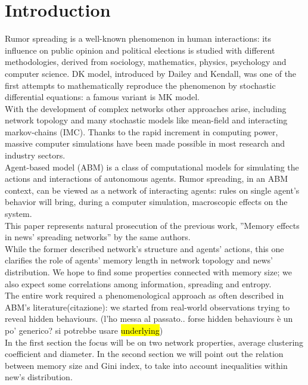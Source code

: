 \section{Introduction} \label{introduction}
Rumor spreading is a well-known phenomenon in human interactions:
its influence on public opinion\cite{publicoprumsp} and political
elections\cite{politicalrumsp} is studied with different
methodologies, derived from sociology, mathematics,
physics, psychology and computer science.
DK model,\cite{DKmodel} introduced by Dailey and Kendall, was one of
the first attempts to mathematically reproduce the phenomenon by
stochastic differential equations: a famous variant is MK
model.\cite{MKmodel}\\
With the development of complex networks other approaches arise,
including network topology and many stochastic models
like mean-field\cite{meanfield} and interacting markov-chains\cite{IMC} (IMC).
Thanks to the rapid increment in computing power,
massive computer simulations have been made possible in
most research and industry sectors.\\
Agent-based model (ABM) is a class of computational models for
simulating the actions and interactions of autonomous
agents.\cite{Agentbased}
Rumor spreading, in an ABM context, can be viewed as a network
of interacting agents: rules on single agent's behavior
will bring, during a computer simulation, macroscopic
effects on the system.\\
This paper represents natural prosecution of the previous work,
''Memory effects in news' spreading networks'' by the same
authors.\cite{ourpaper}\\
While the former described network's structure and agents' actions,
this one clarifies the role of agents' memory length in network
topology and news' distribution.
We hope to find some properties connected with memory size;
we also expect some correlations among information,
spreading and entropy.\\
The entire work required a phenomenological approach as often described in
ABM's literature(citazione): we started from real-world observations trying
to reveal hidden behaviours.
(l'ho messa al passato.. forse hidden behaviours è un po' generico?
si potrebbe usare \hl{underlying})\\
 In the first section the focus will be on two network properties, average clustering coefficient
and diameter. In the second section we will point out the relation
between memory size and Gini index, to take into account inequalities
within new's distribution.
